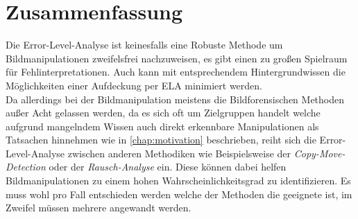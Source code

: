 \chapter{Zusammenfassung}
Die Error-Level-Analyse ist keinesfalls eine Robuste Methode um Bildmanipulationen zweifelsfrei nachzuweisen, es gibt einen zu großen Spielraum für Fehlinterpretationen. Auch kann mit entsprechendem Hintergrundwissen die Möglichkeiten einer Aufdeckung per ELA minimiert werden.\\

Da allerdings bei der Bildmanipulation meistens die Bildforensischen Methoden außer Acht gelassen werden, da es sich oft um Zielgruppen handelt welche aufgrund mangelndem Wissen auch direkt erkennbare Manipulationen als Tatsachen hinnehmen wie in \autoref{chap:motivation} beschrieben, reiht sich die Error-Level-Analyse zwischen anderen Methodiken wie Beispielsweise der \emph{Copy-Move-Detection} oder der \emph{Rausch-Analyse} ein. Diese können dabei helfen Bildmanipulationen zu einem hohen Wahrscheinlichkeitsgrad zu identifizieren. Es muss wohl pro Fall entschieden werden welche der Methoden die geeignete ist, im Zweifel müssen mehrere angewandt werden.








